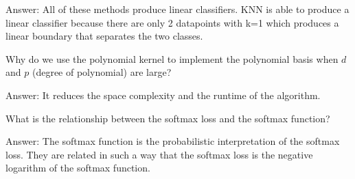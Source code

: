 \documentclass{article}
\def\ans#1{\par\gre{Answer: #1}}
\def\gre#1{{\color{gre}#1}}
\begin{document}
{\ans{All of these methods produce linear classifiers. KNN is able to produce a linear classifier because there are only 2 datapoints with k=1 which produces a linear boundary that separates the two classes.}
\item Why do we use the polynomial kernel to implement the polynomial basis when $d$ and $p$ (degree of polynomial) are large?
\ans{It reduces the space complexity and the runtime of the algorithm.}
\item What is the relationship between the softmax loss and the softmax function?
\ans{The softmax function is the probabilistic interpretation of the softmax loss. They are related in such a way that the softmax loss is the negative logarithm of the softmax function.}
}
\end{document}
